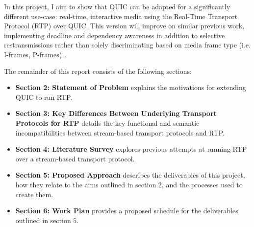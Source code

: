 \documentclass{mprop}
\begin{document}
In this project, I aim to show that QUIC can be adapted for a significantly different use-case: 
real-time, interactive media using the Real-Time Transport Protocol (RTP) \cite{RTP-RFC} over 
QUIC. This version will improve on similar previous work, implementing deadline and dependency 
awareness in addition to selective restransmissions rather than solely discriminating based on 
media frame type (i.e. I-frames, P-frames) \cite {Palmer2018}.


The remainder of this report consists of the following sections:

\begin{itemize}
	\item \textbf{Section 2: Statement of Problem} explains the motivations for extending QUIC to 
	run RTP.
	\item \textbf{Section 3: Key Differences Between Underlying Transport Protocols for RTP} 
	details the key functional and semantic incompatibilities between stream-based transport 
	protocols and RTP.
	\item \textbf{Section 4: Literature Survey} explores previous attempts at running RTP over a 
	stream-based transport protocol.
	\item \textbf{Section 5: Proposed Approach} describes the deliverables of this project, how 
	they relate to the aims outlined in section 2, and the processes used to create them.
	\item \textbf{Section 6: Work Plan} provides a proposed schedule for the deliverables outlined 
	in section 5.
\end{itemize}

\end{document}
